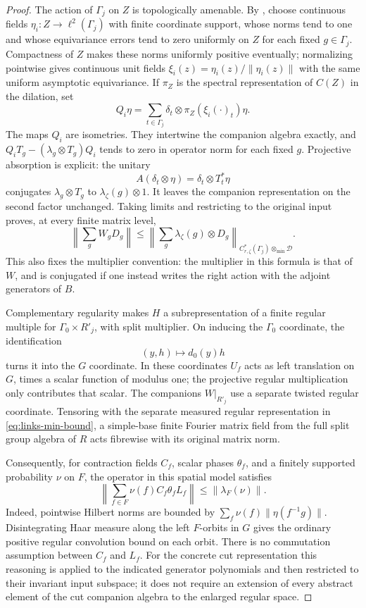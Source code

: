 \begin{proof}
The action of \(\Gamma_j\) on \(Z\) is topologically amenable.
By \cite[Proposition~2.5]{AnantharamanDelaroche2002}, choose continuous
fields \(\eta_i:Z\to\ell^2(\Gamma_j)\) with finite coordinate support,
whose norms tend to one and whose equivariance errors tend to zero
uniformly on \(Z\) for each fixed \(g\in\Gamma_j\).
Compactness of \(Z\) makes these norms uniformly positive eventually;
normalizing pointwise gives continuous unit fields
\(\xi_i(z)=\eta_i(z)/\|\eta_i(z)\|\) with the same uniform
asymptotic equivariance. If \(\pi_Z\) is the
spectral representation of \(C(Z)\) in the dilation, set
\[
 Q_i\eta=\sum_{t\in\Gamma_j}\delta_t\otimes
                    \pi_Z(\xi_i(\cdot)_t)\eta.
\]
The maps \(Q_i\) are isometries. They intertwine the companion
algebra exactly, and
\(Q_iT_g-(\lambda_g\otimes T_g)Q_i\) tends to zero in operator
norm for each fixed \(g\). Projective absorption is explicit:
the unitary
\[
 A(\delta_t\otimes\eta)=\delta_t\otimes T_t^*\eta
\]
conjugates \(\lambda_g\otimes T_g\) to
\(\lambda_{\zeta}(g)\otimes1\). It leaves the companion
representation on the second factor unchanged. Taking limits and
restricting to the original input proves, at every finite matrix level,
\begin{equation}
 \left\|\sum_g W_gD_g\right\|
 \leq
 \left\|\sum_g\lambda_{\zeta}(g)\otimes D_g\right\|_{
                  C^*_{r,\zeta}(\Gamma_j)\otimes_{\min}\mathcal D}.
 \label{eq:links-min-bound}
\end{equation}
This also fixes the multiplier convention: the multiplier in this
formula is that of \(W\), and is conjugated if one instead writes the
right action with the adjoint generators of \(B\).

Complementary regularity makes
\(H\) a subrepresentation of a finite regular multiple for
\(\Gamma_0\times R'_j\), with split multiplier. On inducing the
\(\Gamma_0\) coordinate, the identification
\[
 (y,h)\longmapsto d_0(y)h
\]
turns it into the \(G\) coordinate. In these coordinates \(U_f\)
acts as left translation on \(G\), times a scalar function of modulus
one; the projective regular multiplication only contributes that
scalar. The companions \(W|_{R'_j}\) use a separate twisted regular
coordinate. Tensoring with the separate measured regular
representation in \eqref{eq:links-min-bound}, a simple-base finite
Fourier matrix field from the full split group algebra of \(R\) acts
fibrewise with its original matrix norm.

Consequently, for contraction fields \(C_f\), scalar phases
\(\theta_f\), and a finitely supported probability \(\nu\) on
\(F\), the operator in this spatial model satisfies
\[
 \left\|\sum_{f\in F}\nu(f)C_f\theta_f L_f\right\|
       \leq\|\lambda_F(\nu)\|.
\]
Indeed, pointwise Hilbert norms are bounded by
\(\sum_f\nu(f)\|\eta(f^{-1}g)\|\). Disintegrating Haar measure
along the left \(F\)-orbits in \(G\) gives the ordinary positive
regular convolution bound on each orbit. There is no commutation
assumption between \(C_f\) and \(L_f\). For the concrete cut
representation this reasoning is applied to the indicated generator
polynomials and then restricted to their invariant input subspace; it
does not require an extension of every abstract element of the cut
companion algebra to the enlarged regular space.


\end{proof}
